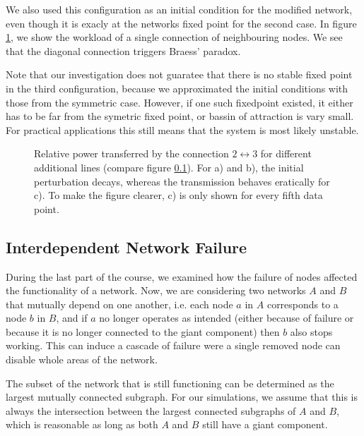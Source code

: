 \documentclass{scrartcl}
\begin{document}
We also used this configuration as an initial condition for the modified network, even though it is exacly at the networks fixed point for the second case. In figure \ref{fig:B31}, we show the workload of a single connection of neighbouring nodes. We see that the diagonal connection triggers Braess' paradox. 

Note that our investigation does not guaratee that there is no stable fixed point in the third configuration, because we approximated the initial conditions with those from the symmetric case. However, if one such fixedpoint existed, it either has to be far from the symetric fixed point, or bassin of attraction is vary small. For practical applications this still means that the system is most likely unstable.

\begin{figure}[h]
    \centering
    \caption{Relative power transferred by the connection $ 2 \leftrightarrow 3$ for different additional lines (compare figure \ref{}). For a) and b), the initial perturbation decays, whereas the transmission behaves eratically for c). To make the figure clearer, c) is only shown for every fifth data point. }
    \label{fig:B31}
\end{figure}


\subsection{Interdependent Network Failure}
During the last part of the course, we examined how the failure of nodes affected the functionality of a network. Now, we are considering two networks $A$ and $B$ that mutually depend on one another, 
i.e. each node $a$ in $A$ corresponds to a node $b$ in $B$, and if $a$ no longer operates as intended (either because of failure or because it is no longer connected to the giant component) then $b$ also stops working. 
This can induce a cascade of failure were a single removed node can disable whole areas of the network.

The subset of the network that is still functioning can be determined as the largest mutually connected subgraph. For our simulations, we assume that this is always the intersection between the largest connected subgraphs of $A$ and $B$, which is reasonable as long as both $A$ and $B$ still have a giant component. 
\end{document}
